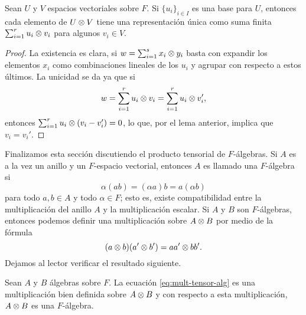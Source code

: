 \begin{corollary}
  Sean $U$ y $V$ espacios vectoriales sobre $F$. Si $\{u_i\}_{i\in I}$ es una base para $U$, entonces cada elemento de $U \otimes V$ tiene una representación única como suma finita $\sum_{i=1}^r u_i \otimes v_i$ para algunos $v_i\in V$.
\end{corollary}
\begin{proof}
  La existencia es clara, si $w = \sum_{i=1}^s x_i \otimes y_i$ basta con expandir los elementos $x_i$ como combinaciones lineales de los $u_i$ y agrupar con respecto a estos últimos. La unicidad se da ya que si 
  \[
    w = \sum_{i=1}^r u_i \otimes v_i = \sum_{i=1}^r u_i \otimes v_i',
  \]
  entonces $\sum_{i=1}^r u_i \otimes (v_i-v_i') = 0$, lo que, por el lema anterior, implica que $v_i = v_i'$.
\end{proof}

Finalizamos esta sección discutiendo el producto tensorial de $F$-álgebras. Si $A$ es a la vez un anillo y un $F$-espacio vectorial, entonces $A$ es llamado una $F$-álgebra si 
\[
  \alpha (ab) = (\alpha a)b = a (\alpha b)
\]
para todo $a,b \in A$ y todo $\alpha \in F$; esto es, existe compatibilidad entre la multiplicación del anillo $A$ y la multiplicación escalar. Si $A$ y $B$ son $F$-álgebras, entonces podemos definir una multiplicación sobre $A \otimes B$ por medio de la fórmula
\begin{equation}
  (a \otimes b)(a' \otimes b') = aa' \otimes bb'. \label{eq:mult-tensor-alg}
\end{equation}
Dejamos al lector verificar el resultado siguiente.

\begin{proposition}
  Sean $A$ y $B$ álgebras sobre $F$. La ecuación \eqref{eq:mult-tensor-alg} es una multiplicación bien definida sobre $A \otimes B$ y con respecto a esta multiplicación, $A\otimes B$ es una $F$-álgebra.
\end{proposition}





